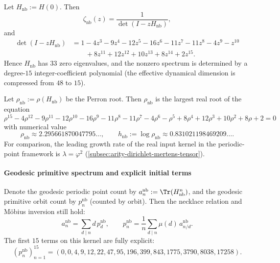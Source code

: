 \begin{theorem}\label{thm:real-input-40-geodesic-det}
Let \(H_{\mathrm{nb}}:=H(0)\). Then
\[
\zeta_{\mathrm{nb}}(z)=\frac{1}{\det(I-zH_{\mathrm{nb}})},
\]
and
\[
\boxed{
\begin{aligned}
\det(I-zH_{\mathrm{nb}})
&=1-4z^3-9z^4-12z^5-16z^6-11z^7-11z^8-4z^9-z^{10}\\
&\qquad +8z^{11}+12z^{12}+10z^{13}+8z^{14}+2z^{15}.
\end{aligned}
}
\]
Hence \(H_{\mathrm{nb}}\) has \(33\) zero eigenvalues, and the nonzero spectrum is determined by a degree-\(15\) integer-coefficient polynomial (the effective dynamical dimension is compressed from \(48\) to \(15\)).
\end{theorem}

\begin{corollary}\label{cor:real-input-40-geodesic-entropy}
Let \(\rho_{\mathrm{nb}}:=\rho(H_{\mathrm{nb}})\) be the Perron root. Then \(\rho_{\mathrm{nb}}\) is the largest real root of the equation
\[
\rho^{15}-4\rho^{12}-9\rho^{11}-12\rho^{10}-16\rho^{9}-11\rho^{8}-11\rho^{7}-4\rho^{6}-\rho^{5}+8\rho^{4}+12\rho^{3}+10\rho^{2}+8\rho+2=0
\]
with numerical value
\[
\rho_{\mathrm{nb}}\approx 2.295661870047795\ldots,\qquad
h_{\mathrm{nb}}:=\log\rho_{\mathrm{nb}}\approx 0.831021198469209\ldots.
\]
For comparison, the leading growth rate of the real input kernel in the periodic-point framework is \(\lambda=\varphi^2\) (\ref{subsec:arity-dirichlet-mertens-tensor}).
\end{corollary}

\paragraph{Geodesic primitive spectrum and explicit initial terms}
Denote the geodesic periodic point count by \(a_n^{\mathrm{nb}}:=\Tr(H_{\mathrm{nb}}^n)\), and the geodesic primitive orbit count by \(p_n^{\mathrm{nb}}\) (counted by orbit).
Then the necklace relation and M\"{o}bius inversion still hold:
\[
a_n^{\mathrm{nb}}=\sum_{d\mid n} d\,p_d^{\mathrm{nb}},
\qquad
p_n^{\mathrm{nb}}=\frac1n\sum_{d\mid n}\mu(d)\,a_{n/d}^{\mathrm{nb}}.
\]
The first \(15\) terms on this kernel are fully explicit:
\[
(p_n^{\mathrm{nb}})_{n=1}^{15}=(0,0,4,9,12,22,47,95,196,399,843,1775,3790,8038,17258).
\]

